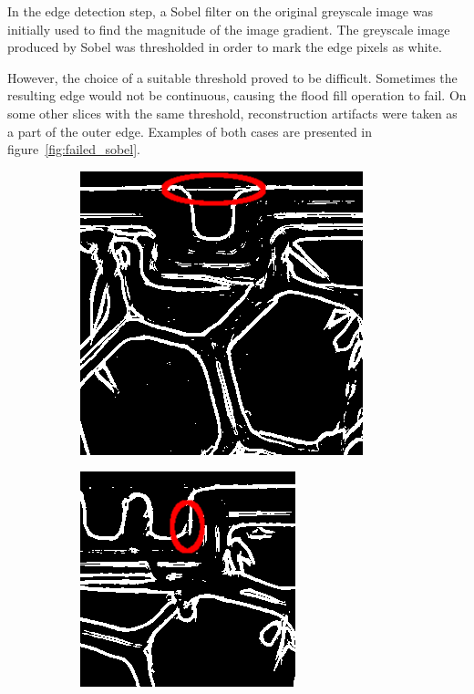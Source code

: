 \documentclass[a4paper,twoside,12pt]{article}
\begin{document}
In the edge detection step, a Sobel filter on the original greyscale image was initially used to find the magnitude of the image gradient. The greyscale image produced by Sobel was thresholded in order to mark the edge pixels as white.

However, the choice of a suitable threshold proved to be difficult. Sometimes the resulting edge would not be continuous, causing the flood fill operation to fail. On some other slices with the same threshold, reconstruction artifacts were taken as a part of the outer edge. Examples of both cases are presented in figure~\ref{fig:failed_sobel}.
\begin{figure}
    \centering
    \begin{subfigure}{0.5\textwidth}
        \centering
        \includegraphics[width=0.8\linewidth]{images/sobel_binary_208.png}
    \end{subfigure}%
    \begin{subfigure}{0.5\textwidth}
        \centering
        \includegraphics[width=0.8\linewidth]{images/sobel_binary_290.png}

\end{subfigure}
\end{figure}
\end{document}
